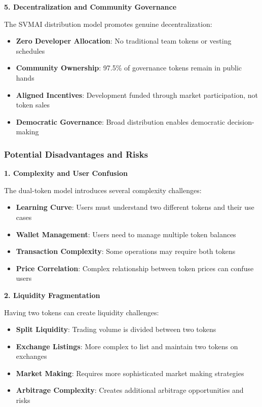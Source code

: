 \documentclass[12pt,a4paper]{article}
\begin{document}
\textbf{5. Decentralization and Community Governance}

The SVMAI distribution model promotes genuine decentralization:

\begin{itemize}
\item \textbf{Zero Developer Allocation}: No traditional team tokens or vesting schedules
\item \textbf{Community Ownership}: 97.5\% of governance tokens remain in public hands
\item \textbf{Aligned Incentives}: Development funded through market participation, not token sales
\item \textbf{Democratic Governance}: Broad distribution enables democratic decision-making
\end{itemize}

\subsubsection{Potential Disadvantages and Risks}

\textbf{1. Complexity and User Confusion}

The dual-token model introduces several complexity challenges:

\begin{itemize}
\item \textbf{Learning Curve}: Users must understand two different tokens and their use cases
\item \textbf{Wallet Management}: Users need to manage multiple token balances
\item \textbf{Transaction Complexity}: Some operations may require both tokens
\item \textbf{Price Correlation}: Complex relationship between token prices can confuse users
\end{itemize}

\textbf{2. Liquidity Fragmentation}

Having two tokens can create liquidity challenges:

\begin{itemize}
\item \textbf{Split Liquidity}: Trading volume is divided between two tokens
\item \textbf{Exchange Listings}: More complex to list and maintain two tokens on exchanges
\item \textbf{Market Making}: Requires more sophisticated market making strategies
\item \textbf{Arbitrage Complexity}: Creates additional arbitrage opportunities and risks
\end{itemize}
\end{document}
